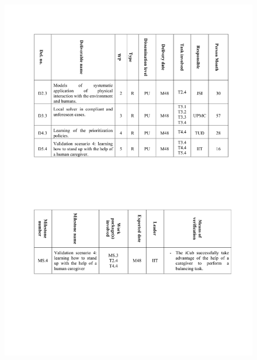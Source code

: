 \documentclass[12pt,a4paper,twoside]{article}
\begin{document}
\begin{figure}
\centering
\includegraphics[width=\textwidth]{./images/milestones.pdf}
\end{figure}

\newpage

\makeatletter
\renewcommand\@biblabel[1]{[#1]}
\makeatother


% 

\end{document}
